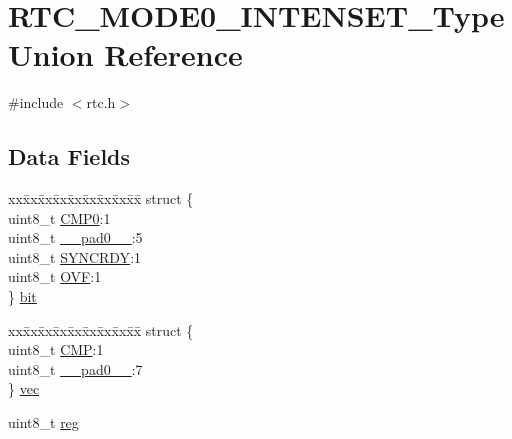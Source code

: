 \hypertarget{union_r_t_c___m_o_d_e0___i_n_t_e_n_s_e_t___type}{}\section{R\+T\+C\+\_\+\+M\+O\+D\+E0\+\_\+\+I\+N\+T\+E\+N\+S\+E\+T\+\_\+\+Type Union Reference}
\label{union_r_t_c___m_o_d_e0___i_n_t_e_n_s_e_t___type}


{\ttfamily \#include $<$rtc.\+h$>$}

\subsection*{Data Fields}
\begin{DoxyCompactItemize}
\item 
\begin{tabbing}
xx\=xx\=xx\=xx\=xx\=xx\=xx\=xx\=xx\=\kill
struct \{\\
\>uint8\_t \mbox{\hyperlink{union_r_t_c___m_o_d_e0___i_n_t_e_n_s_e_t___type_adc7d4e5f43b2e44a828fdfc89f126899}{CMP0}}:1\\
\>uint8\_t \mbox{\hyperlink{union_r_t_c___m_o_d_e0___i_n_t_e_n_s_e_t___type_a8b4eebe79ded0459acec2f4950102ba3}{\_\_pad0\_\_}}:5\\
\>uint8\_t \mbox{\hyperlink{union_r_t_c___m_o_d_e0___i_n_t_e_n_s_e_t___type_aece75e176e4fd55bf68937f1b56bde63}{SYNCRDY}}:1\\
\>uint8\_t \mbox{\hyperlink{union_r_t_c___m_o_d_e0___i_n_t_e_n_s_e_t___type_ac6a3a2f132415ccc7b2b360497b74b15}{OVF}}:1\\
\} \mbox{\hyperlink{union_r_t_c___m_o_d_e0___i_n_t_e_n_s_e_t___type_a6568391268f7debb41b2366dbff1dce5}{bit}}\\

\end{tabbing}\item 
\begin{tabbing}
xx\=xx\=xx\=xx\=xx\=xx\=xx\=xx\=xx\=\kill
struct \{\\
\>uint8\_t \mbox{\hyperlink{union_r_t_c___m_o_d_e0___i_n_t_e_n_s_e_t___type_ac5a98d851fe96017f1c4624476deb57a}{CMP}}:1\\
\>uint8\_t \mbox{\hyperlink{union_r_t_c___m_o_d_e0___i_n_t_e_n_s_e_t___type_a8b4eebe79ded0459acec2f4950102ba3}{\_\_pad0\_\_}}:7\\
\} \mbox{\hyperlink{union_r_t_c___m_o_d_e0___i_n_t_e_n_s_e_t___type_a8d9d6a33976f7a528bc729fe3327a84d}{vec}}\\

\end{tabbing}\item 
uint8\+\_\+t \mbox{\hyperlink{union_r_t_c___m_o_d_e0___i_n_t_e_n_s_e_t___type_a9428adc9af4653a2050e2536b55dec8d}{reg}}
\end{DoxyCompactItemize}


